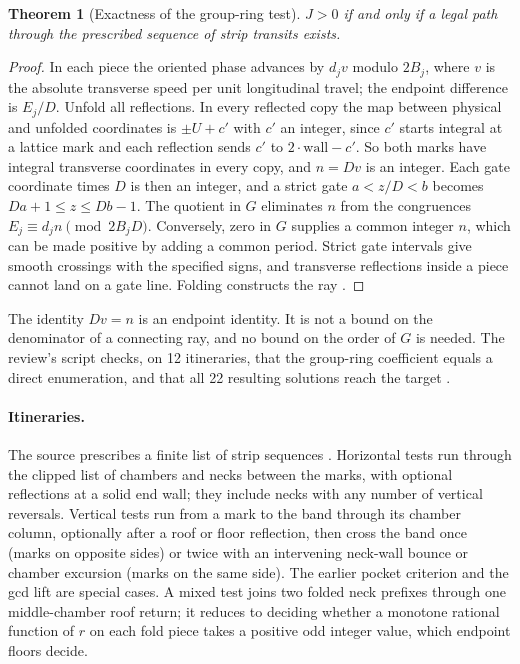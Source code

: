 \documentclass[11pt]{article}
\newtheorem{theorem}{Theorem}
\theoremstyle{definition}
\theoremstyle{remark}
\begin{document}
\begin{theorem}[Exactness of the group-ring test]\label{thm:J}
$J>0$ if and only if a legal path through the prescribed sequence of strip
transits exists.
\end{theorem}

\begin{proof}
In each piece the oriented phase advances by $d_jv$ modulo $2B_j$, where $v$ is
the absolute transverse speed per unit longitudinal travel; the endpoint
difference is $E_j/D$. Unfold all reflections. In every reflected copy the map
between physical and unfolded coordinates is $\pm U+c'$ with $c'$ an integer,
since $c'$ starts integral at a lattice mark and each reflection sends $c'$ to
$2\cdot\mathrm{wall}-c'$. So both marks have integral transverse coordinates in
every copy, and $n=Dv$ is an integer. Each gate coordinate times $D$ is then an
integer, and a strict gate $a<z/D<b$ becomes $Da+1\le z\le Db-1$. The quotient in
$G$ eliminates $n$ from the congruences $E_j\equiv d_jn\pmod{2B_jD}$. Conversely,
zero in $G$ supplies a common integer $n$, which can be made positive by adding
a common period. Strict gate intervals give smooth crossings with the specified
signs, and transverse reflections inside a piece cannot land on a gate line.
Folding constructs the ray \cite{R5,d203}.
\end{proof}

The identity $Dv=n$ is an endpoint identity. It is not a bound on the denominator
of a connecting ray, and no bound on the order of $G$ is needed. The review's
script checks, on 12 itineraries, that the group-ring coefficient equals a direct
enumeration, and that all 22 resulting solutions reach the target \cite{d203}.

\paragraph{Itineraries.} The source prescribes a finite list of strip
sequences \cite{R5}. Horizontal tests run through the clipped list of chambers and
necks between the marks, with optional reflections at a solid end wall; they
include necks with any number of vertical reversals. Vertical tests run from a
mark to the band through its chamber column, optionally after a roof or floor
reflection, then cross the band once (marks on opposite sides) or twice with an
intervening neck-wall bounce or chamber excursion (marks on the same side).
The earlier pocket criterion and the gcd lift are special cases. A mixed test
joins two folded neck prefixes through one middle-chamber roof return; it reduces
to deciding whether a monotone rational function of $r$ on each fold piece takes
a positive odd integer value, which endpoint floors decide.
\end{document}
